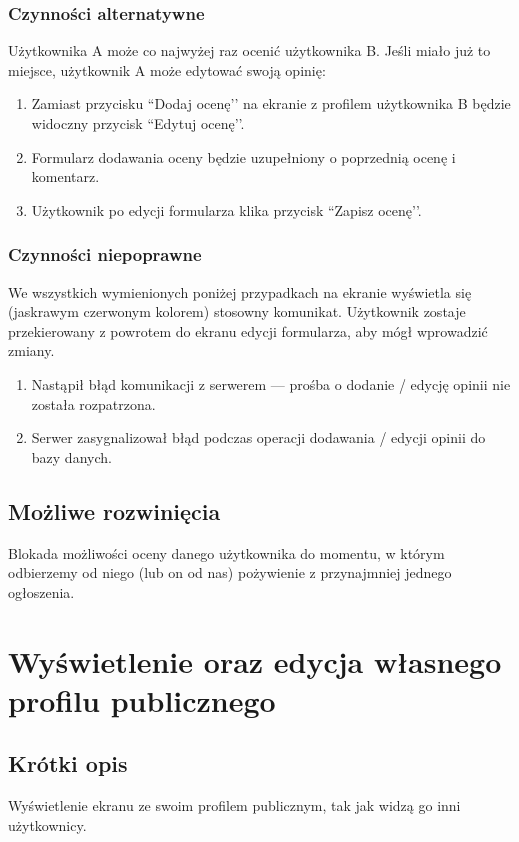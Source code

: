 \documentclass[12pt,a4paper,twoside]{article}
\begin{document}
    
    
    \subsubsection{Czynności alternatywne}
    Użytkownika A może co najwyżej raz ocenić użytkownika B. Jeśli miało już to miejsce, użytkownik A może edytować swoją opinię:
    \begin{enumerate}
        \item Zamiast przycisku ``Dodaj ocenę’’ na ekranie z profilem użytkownika B będzie widoczny przycisk ``Edytuj ocenę’’.
        \item Formularz dodawania oceny będzie uzupełniony o poprzednią ocenę i komentarz.
        \item Użytkownik po edycji formularza klika przycisk ``Zapisz ocenę’’.
    \end{enumerate}
    
    
    \subsubsection{Czynności niepoprawne}
    We wszystkich wymienionych poniżej przypadkach na ekranie wyświetla się (jaskrawym czerwonym kolorem) stosowny komunikat. Użytkownik zostaje
    przekierowany z powrotem do ekranu edycji formularza, aby mógł wprowadzić zmiany.
    \begin{enumerate}
        \item Nastąpił błąd komunikacji z serwerem --- prośba o dodanie / edycję opinii nie została rozpatrzona.
        \item Serwer zasygnalizował błąd podczas operacji dodawania / edycji opinii do bazy danych.
    \end{enumerate}
    
    
    \subsection{Możliwe rozwinięcia}
    Blokada możliwości oceny danego użytkownika do momentu, w którym odbierzemy od niego (lub on od nas) pożywienie z przynajmniej jednego ogłoszenia.
    
    
    \section{Wyświetlenie oraz edycja własnego profilu publicznego}
    
    \subsection{Krótki opis}
    Wyświetlenie ekranu ze swoim profilem publicznym, tak jak widzą go inni użytkownicy.
    
\end{document}
